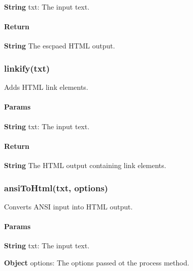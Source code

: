 \begin{DoxyItemize}
\item {\bfseries String} {\ttfamily txt}\+: The input text.
\end{DoxyItemize}

\paragraph*{Return}


\begin{DoxyItemize}
\item {\bfseries String} The escpaed H\+T\+ML output.
\end{DoxyItemize}

\subsubsection*{{\ttfamily linkify(txt)}}

Adds H\+T\+ML link elements.

\paragraph*{Params}


\begin{DoxyItemize}
\item {\bfseries String} {\ttfamily txt}\+: The input text.
\end{DoxyItemize}

\paragraph*{Return}


\begin{DoxyItemize}
\item {\bfseries String} The H\+T\+ML output containing link elements.
\end{DoxyItemize}

\subsubsection*{{\ttfamily ansi\+To\+Html(txt, options)}}

Converts A\+N\+SI input into H\+T\+ML output.

\paragraph*{Params}


\begin{DoxyItemize}
\item {\bfseries String} {\ttfamily txt}\+: The input text.
\item {\bfseries Object} {\ttfamily options}\+: The options passed ot the {\ttfamily process} method.
\end{DoxyItemize}

